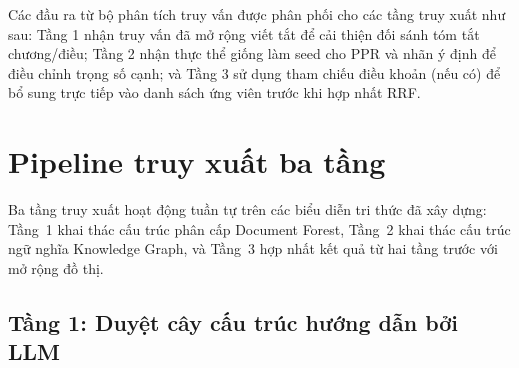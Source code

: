 \begin{table}[htbp]
  \centering
  \caption{Ví dụ phân tích truy vấn trên ba câu hỏi mẫu}
  \label{tab:query-analysis-example}
\end{table}

Các đầu ra từ bộ phân tích truy vấn được phân phối cho các tầng truy xuất như sau:
Tầng 1 nhận truy vấn đã mở rộng viết tắt để cải thiện đối sánh tóm tắt chương/điều;
Tầng 2 nhận thực thể giống làm seed cho PPR và nhãn ý định để điều chỉnh trọng số
cạnh; và Tầng 3 sử dụng tham chiếu điều khoản (nếu có) để bổ sung trực tiếp vào
danh sách ứng viên trước khi hợp nhất RRF.

\section{Pipeline truy xuất ba tầng}
\label{sec:pipeline-truy-xuat}

Ba tầng truy xuất hoạt động tuần tự trên các biểu diễn tri thức đã xây dựng: Tầng~1
khai thác cấu trúc phân cấp Document Forest, Tầng~2 khai thác cấu trúc ngữ nghĩa
Knowledge Graph, và Tầng~3 hợp nhất kết quả từ hai tầng trước với mở rộng đồ thị.

\subsection{Tầng 1: Duyệt cây cấu trúc hướng dẫn bởi LLM}
\label{subsec:tang1-duyet-cay}

